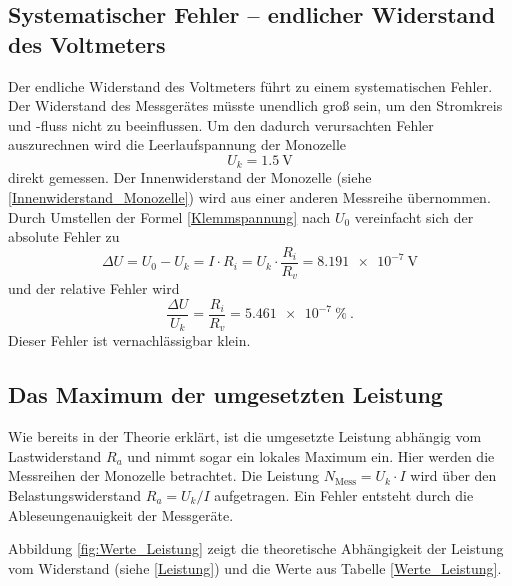 \subsection{Systematischer Fehler -- endlicher Widerstand des Voltmeters}
Der endliche Widerstand des Voltmeters führt zu einem systematischen Fehler. Der Widerstand des Messgerätes müsste unendlich groß sein, um den Stromkreis und -fluss nicht zu beeinflussen. Um den dadurch verursachten Fehler auszurechnen wird die Leerlaufspannung der Monozelle
\begin{equation}
U_k = \SI{1.5}{\volt}
\end{equation}
direkt gemessen.
Der Innenwiderstand der Monozelle (siehe \eqref{Innenwiderstand_Monozelle}) wird aus einer anderen Messreihe übernommen. Durch Umstellen der Formel \eqref{Klemmspannung} nach $U_0$ vereinfacht sich der absolute Fehler zu 
\begin{equation}
\Delta U = U_0 - U_k = I\cdot R_i = U_k \cdot \frac{R_i}{R_v} = \SI{8.191e-7}{\volt}
\end{equation}
und der relative Fehler wird 
\begin{equation}
\frac{\Delta U}{U_k} = \frac{R_i}{R_v} = \SI{5.461e-7}{\%} \ .
\end{equation}
Dieser Fehler ist vernachlässigbar klein.
 
\clearpage 
 
\subsection{Das Maximum der umgesetzten Leistung}
Wie bereits in der Theorie erklärt, ist die umgesetzte Leistung abhängig vom Lastwiderstand $R_a$ und nimmt sogar ein lokales Maximum ein. Hier werden die Messreihen der Monozelle betrachtet. Die Leistung $N_\text{Mess} = U_k \cdot I $ wird über den Belastungswiderstand $R_a = U_k / I$ aufgetragen. Ein Fehler entsteht durch die Ableseungenauigkeit der Messgeräte.

\begin{center}

\label{Werte_Leistung}
\end{center}

Abbildung \ref{fig:Werte_Leistung} zeigt die theoretische Abhängigkeit der Leistung vom Widerstand (siehe \eqref{Leistung}) und die Werte aus Tabelle \ref{Werte_Leistung}.

